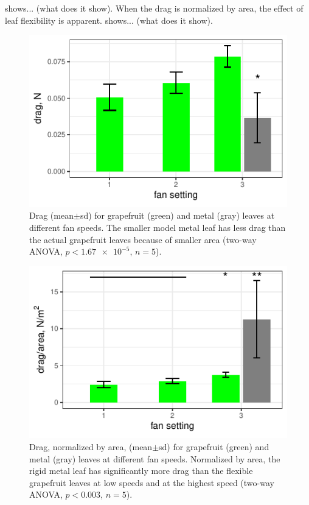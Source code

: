  shows... (what does it show). When the drag is normalized by area, the effect of leaf flexibility is apparent.  shows... (what does it show). 

\begin{figure}
\begin{center}
\includegraphics{data/results1.pdf}
\end{center}
\caption{Drag (mean$\pm$sd) for grapefruit (green) and metal (gray) leaves at different fan speeds. The smaller model metal leaf has less drag than the actual grapefruit leaves because of smaller area (two-way ANOVA, $p<\num{1.67e-5}$, $n=5$).}
\label{fig:results1}
\end{figure}

\begin{figure}
\begin{center}
\includegraphics{data/results2.pdf}
\end{center}
\caption{Drag, normalized by area, (mean$\pm$sd) for grapefruit (green) and metal (gray) leaves at different fan speeds. Normalized by area, the rigid metal leaf has significantly more drag than the flexible grapefruit leaves at low speeds and at the highest speed (two-way ANOVA, $p<0.003$, $n=5$).}
\label{fig:results2}
\end{figure}


